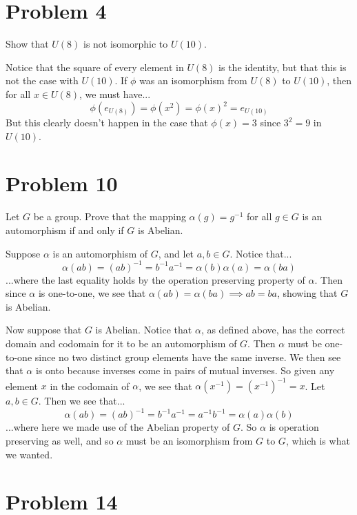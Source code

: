 \documentclass{article}
\begin{document}
\section*{Problem 4}

Show that $U(8)$ is not isomorphic to $U(10)$.

Notice that the square of every element in $U(8)$ is the identity, but that
this is not the case with $U(10)$.  If $\phi$ was an isomorphism from $U(8)$
to $U(10)$, then for all $x\in U(8)$, we must have...
\begin{equation*}
\phi(e_{U(8)}) = \phi(x^2) = \phi(x)^2 = e_{U(10)}
\end{equation*}
But this clearly doesn't happen in the case that $\phi(x)=3$ since $3^2=9$ in $U(10)$.

\section*{Problem 10}

Let $G$ be a group.  Prove that the mapping $\alpha(g)=g^{-1}$ for all $g\in G$
is an automorphism if and only if $G$ is Abelian.

Suppose $\alpha$ is an automorphism of $G$, and let $a,b\in G$.  Notice that...
\begin{equation*}
\alpha(ab) = (ab)^{-1} = b^{-1}a^{-1} = \alpha(b)\alpha(a) = \alpha(ba)
\end{equation*}
...where the last equality holds by the operation preserving property of $\alpha$.
Then since $\alpha$ is one-to-one, we see that $\alpha(ab)=\alpha(ba)\implies ab=ba$,
showing that $G$ is Abelian.

Now suppose that $G$ is Abelian.  Notice that $\alpha$, as defined above, has
the correct domain and codomain for it to be an automorphism of $G$.
Then $\alpha$ must be one-to-one since no two distinct group elements have
the same inverse.  We then see that $\alpha$ is onto because inverses
come in pairs of mutual inverses.  So given any element $x$ in the codomain of $\alpha$,
we see that $\alpha(x^{-1})=(x^{-1})^{-1}=x$.  Let $a,b\in G$.  Then we see that...
\begin{equation*}
\alpha(ab) = (ab)^{-1} = b^{-1}a^{-1} = a^{-1}b^{-1} = \alpha(a)\alpha(b)
\end{equation*}
...where here we made use of the Abelian property of $G$.  So $\alpha$ is operation
preserving as well, and so $\alpha$ must be an isomorphism from $G$ to $G$, which
is what we wanted.

\section*{Problem 14}
\end{document}
